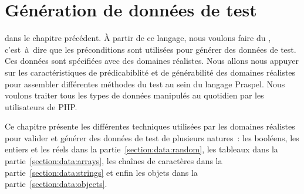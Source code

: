 \chapter{Génération de données de test}
\label{chapter:data}

\mminitoc

dans le chapitre précédent. À partir de ce langage, nous voulons faire du
, c'est~à~dire que les préconditions sont
utilisées pour générer des données de test. Ces données sont spécifiées avec des
domaines réalistes. Nous allons nous appuyer sur les caractéristiques de
prédicabiblité et de générabilité des domaines réalistes pour assembler
différentes méthodes du test au sein du langage Praspel. Nous voulons traiter
tous les types de données manipulés au quotidien par les utilisateurs de PHP.

Ce chapitre présente les différentes techniques utilisées par les domaines
réalistes pour valider et générer des données de test de plusieurs natures~: les
booléens, les entiers et les réels dans la partie~\ref{section:data:random}, les
tableaux dans la partie~\ref{section:data:arrays}, les chaînes de caractères
dans la partie~\ref{section:data:strings} et enfin les objets dans la
partie~\ref{section:data:objects}.

